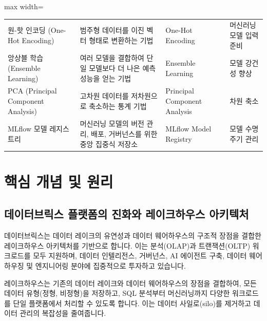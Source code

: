 \documentclass[11pt,a4paper]{article}
\theoremstyle{definition}
\begin{document}
\begin{adjustbox}{max width=\textwidth}
\begin{tabular}{llll}
원-핫 인코딩 (One-Hot Encoding) & 범주형 데이터를 이진 벡터 형태로 변환하는 기법 & One-Hot Encoding & 머신러닝 모델 입력 준비 \\
앙상블 학습 (Ensemble Learning) & 여러 모델을 결합하여 단일 모델보다 더 나은 예측 성능을 얻는 기법 & Ensemble Learning & 모델 강건성 향상 \\
PCA (Principal Component Analysis) & 고차원 데이터를 저차원으로 축소하는 통계 기법 & Principal Component Analysis & 차원 축소 \\
MLflow 모델 레지스트리 & 머신러닝 모델의 버전 관리, 배포, 거버넌스를 위한 중앙 집중식 저장소 & MLflow Model Registry & 모델 수명 주기 관리 \\
\bottomrule
\end{tabular}
\end{adjustbox}

\newpage
\section*{핵심 개념 및 원리}

\subsection{데이터브릭스 플랫폼의 진화와 레이크하우스 아키텍처}

데이터브릭스는 데이터 레이크의 유연성과 데이터 웨어하우스의 구조적 장점을 결합한 레이크하우스 아키텍처를 기반으로 합니다. 이는 분석(OLAP)과 트랜잭션(OLTP) 워크로드를 모두 지원하며, 데이터 인텔리전스, 거버넌스, AI 에이전트 구축, 데이터 웨어하우징 및 엔지니어링 분야에 집중적으로 투자하고 있습니다.

\begin{tcolorbox}[summary={레이크하우스 아키텍처의 중요성}]
레이크하우스는 기존의 데이터 레이크와 데이터 웨어하우스의 장점을 결합하여, 모든 데이터 유형(정형, 비정형)을 저장하고, SQL 분석부터 머신러닝까지 다양한 워크로드를 단일 플랫폼에서 처리할 수 있도록 합니다. 이는 데이터 사일로(silo)를 제거하고 데이터 관리의 복잡성을 줄여줍니다.
\end{tcolorbox}
\end{document}

